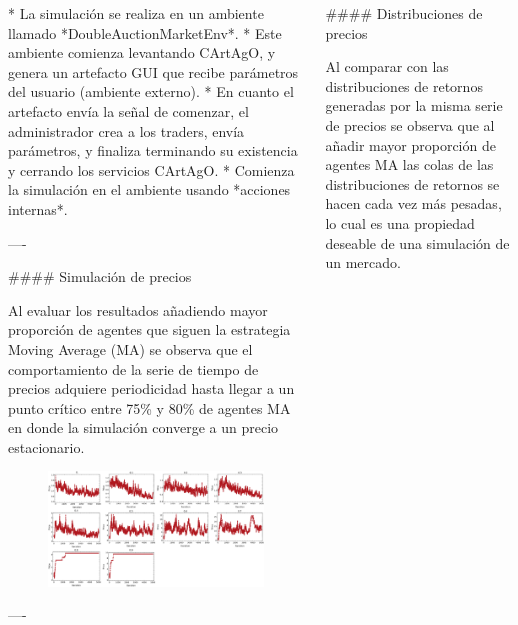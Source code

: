 \documentclass{beamer}
\begin{document}
\begin{frame}[fragile]
\begin{columns}[T]
\begin{column}{.46\textwidth}
\begin{markdown}
* La simulación se realiza en un ambiente llamado *DoubleAuctionMarketEnv*.
* Este ambiente comienza levantando CArtAgO, y genera un artefacto GUI que recibe parámetros del usuario (ambiente externo).
* En cuanto el artefacto envía la señal de comenzar, el administrador crea a los traders, envía parámetros, y finaliza terminando su existencia y cerrando los servicios CArtAgO.
* Comienza la simulación en el ambiente usando *acciones internas*.

----

#### Simulación de precios

Al evaluar los resultados añadiendo mayor proporción de agentes que siguen la estrategia Moving Average (MA) se observa que el comportamiento de la serie de tiempo de precios adquiere periodicidad hasta llegar a un punto crítico entre 75\% y 80\% de agentes MA en donde la simulación converge a un precio estacionario.

\begin{figure}[h!]
\centering
\includegraphics[scale=0.25]{img/price_series.png}
\end{figure}

----

\end{markdown}

\end{column}

\begin{column}{.46\textwidth}

\begin{markdown}

#### Distribuciones de precios

Al comparar con las distribuciones de retornos generadas por la misma serie de precios se observa que al añadir mayor proporción de agentes MA las colas de las distribuciones de retornos se hacen cada vez más pesadas, lo cual es una propiedad deseable de una simulación de un mercado.


\end{markdown}
\end{column}
\end{columns}
\end{frame}
\end{document}
